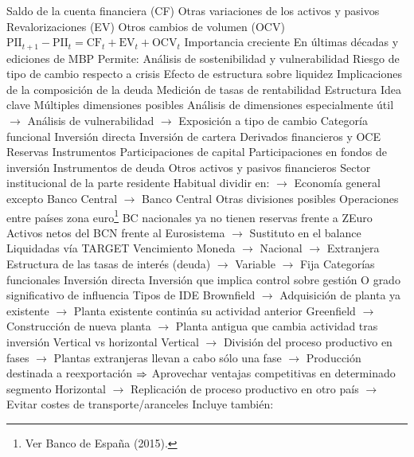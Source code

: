 \documentclass{nuevotema}
\begin{document}
\begin{esquemal}
				\4 Saldo de la cuenta financiera (CF)
				\4 Otras variaciones de los activos y pasivos
				\4[] Revalorizaciones (EV)
				\4[] Otros cambios de volumen (OCV)
				\4 $\text{PII}_{t+1} - \text{PII}_{t} = \text{CF}_t + \text{EV}_t + \text{OCV}_t$
			\3 Importancia creciente
				\4 En últimas décadas y ediciones de MBP
				\4 Permite:
				\4[] Análisis de sostenibilidad y vulnerabilidad
				\4[] Riesgo de tipo de cambio respecto a crisis
				\4[] Efecto de estructura sobre liquidez
				\4[] Implicaciones de la composición de la deuda
				\4[] Medición de tasas de rentabilidad
		\2 Estructura
			\3 Idea clave
				\4 Múltiples dimensiones posibles
				\4 Análisis de dimensiones especialmente útil
				\4[] $\to$ Análisis de vulnerabilidad
				\4[] $\to$ Exposición a tipo de cambio
			\3 Categoría funcional
				\4 Inversión directa
				\4 Inversión de cartera
				\4 Derivados financieros y OCE
				\4 Reservas
			\3 Instrumentos
				\4 Participaciones de capital
				\4 Participaciones en fondos de inversión
				\4 Instrumentos de deuda
				\4 Otros activos y pasivos financieros
			\3 Sector institucional de la parte residente
				\4 Habitual dividir en:
				\4[] $\to$ Economía general excepto Banco Central
				\4[] $\to$ Banco Central
				\4 Otras divisiones posibles
				\4[] Operaciones entre países zona euro\footnote{Ver Banco de España  (2015).}
				\4[] BC nacionales ya no tienen reservas frente a ZEuro
				\4[] Activos netos del BCN frente al Eurosistema
				\4[] $\to$ Sustituto en el balance
				\4[] Liquidadas vía TARGET
				\4[] Vencimiento
				\4[] Moneda
				\4[] $\to$ Nacional
				\4[] $\to$ Extranjera
				\4[] Estructura de las tasas de interés (deuda)
				\4[] $\to$ Variable
				\4[] $\to$ Fija
		\2 Categorías funcionales
			\3 Inversión directa
				\4 Inversión que implica control sobre gestión
				\4[] O grado significativo de influencia
				\4 Tipos de IDE
				\4[] Brownfield
				\4[] $\to$ Adquisición de planta ya existente
				\4[] $\to$ Planta existente continúa su actividad anterior
				\4[] Greenfield
				\4[] $\to$ Construcción de nueva planta
				\4[] $\to$ Planta antigua que cambia actividad tras inversión
				\4 Vertical vs horizontal
				\4[] Vertical
				\4[] $\to$ División del proceso productivo en fases
				\4[] $\to$ Plantas extranjeras llevan a cabo sólo una fase
				\4[] $\to$ Producción destinada a reexportación
				\4[] $\Rightarrow$ Aprovechar ventajas competitivas en determinado segmento
				\4[] Horizontal
				\4[] $\to$ Replicación de proceso productivo en otro país
				\4[] $\to$ Evitar costes de transporte/aranceles
				\4 Incluye también:

\end{esquemal}
\end{document}
